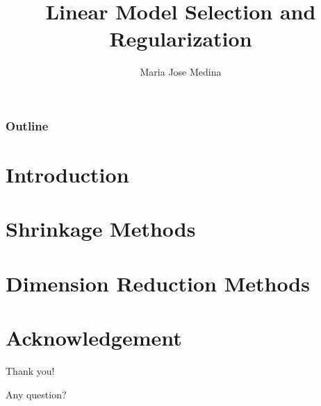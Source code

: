 \documentclass[10pt]{beamer}
\title{Linear Model Selection and Regularization}%
\author[Maria Jose Medina]{Maria Jose Medina}%
\institute[USACH]{Universidad de Santiago de Chile}
\date[\textcolor{white}{October 2022}]
\begin{document}
\frame{\titlepage}
\begin{frame}
\frametitle{Outline}
\tableofcontents
\end{frame}



\section{Introduction}


\section{Shrinkage Methods}


\section{Dimension Reduction Methods}



\section*{Acknowledgement}  
\begin{frame}

\textcolor{myNewColorA}{\huge{\centerline{Thank you!}}}
\vspace*{0.5cm}

\textcolor{myNewColorA}{\Large{\centerline{Any question?}}}
\vspace*{0.5cm}


\end{frame}
\end{document}
